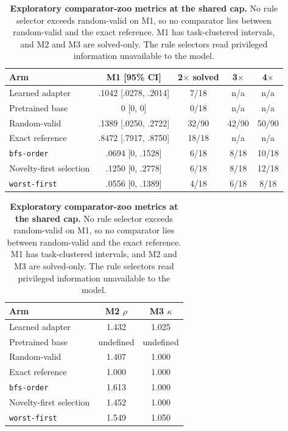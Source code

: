 \begin{table}[t]
\caption{\textbf{Exploratory comparator-zoo metrics at the shared cap.} No rule selector exceeds random-valid on M1, so no comparator lies between random-valid and the exact reference. M1 has task-clustered intervals, and M2 and M3 are solved-only. The rule selectors read privileged information unavailable to the model.}
\label{tab:results-zoo}
\centering\footnotesize
\setlength{\tabcolsep}{4pt}
\begin{tabular}{@{}lcccc@{}}
\toprule[0.4mm]
\rowcolor{mygray}\textbf{Arm} & \textbf{M1 [95\% CI]} & \textbf{2$\times$ solved} & \textbf{3$\times$} & \textbf{4$\times$} \\
\midrule
Learned adapter & .1042 [.0278, .2014] & 7/18 & n/a & n/a \\
Pretrained base & 0 [0, 0] & 0/18 & n/a & n/a \\
\midrule
Random-valid & .1389 [.0250, .2722] & 32/90 & 42/90 & 50/90 \\
\midrule
Exact reference & .8472 [.7917, .8750] & 18/18 & n/a & n/a \\
\midrule
\texttt{bfs-order} & .0694 [0, .1528] & 6/18 & 8/18 & 10/18 \\
Novelty-first selection & .1250 [0, .2778] & 6/18 & 8/18 & 12/18 \\
\texttt{worst-first} & .0556 [0, .1389] & 4/18 & 6/18 & 8/18 \\
\bottomrule
\end{tabular}
\vspace{4pt}
\begin{tabular}{@{}lcc@{}}
\toprule[0.4mm]
\rowcolor{mygray}\textbf{Arm} & \textbf{M2 $\rho$} & \textbf{M3 $\kappa$} \\
\midrule
Learned adapter & 1.432 & 1.025 \\
Pretrained base & undefined & undefined \\
\midrule
Random-valid & 1.407 & 1.000 \\
\midrule
Exact reference & 1.000 & 1.000 \\
\midrule
\texttt{bfs-order} & 1.613 & 1.000 \\
Novelty-first selection & 1.452 & 1.000 \\
\texttt{worst-first} & 1.549 & 1.050 \\
\bottomrule
\end{tabular}
\end{table}

